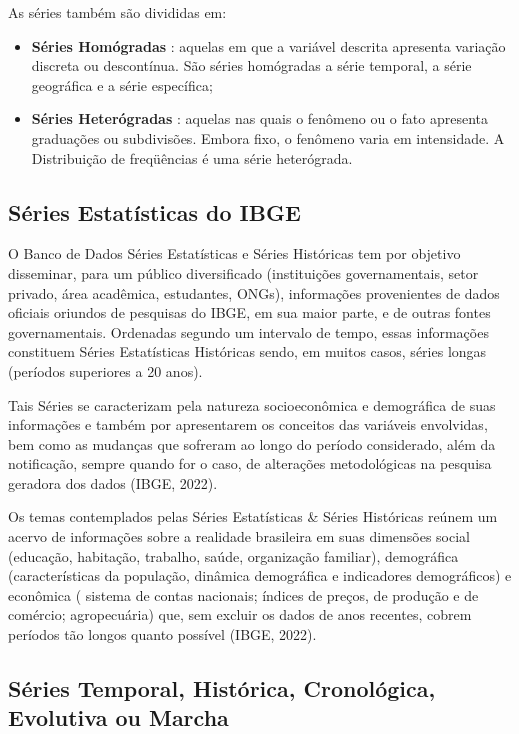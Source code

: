 As séries também são divididas em:


\begin{itemize}
  \item \textbf{Séries Homógradas} : aquelas em que a variável descrita apresenta variação discreta ou descontínua. São séries homógradas a série temporal, a série geográfica e a série específica;
 \item \textbf{Séries Heterógradas} : aquelas nas quais o fenômeno ou o fato apresenta graduações ou subdivisões. Embora fixo, o fenômeno varia em intensidade. A Distribuição de freqüências é uma série heterógrada.
\end{itemize}

\newpage
\subsection{Séries Estatísticas do IBGE}

O Banco de Dados Séries Estatísticas e Séries Históricas tem por objetivo disseminar, para um público diversificado (instituições governamentais, setor privado, área acadêmica, estudantes, ONGs), informações provenientes de dados oficiais oriundos de pesquisas do IBGE, em sua maior parte, e de outras fontes governamentais. Ordenadas segundo um intervalo de tempo, essas informações constituem Séries Estatísticas Históricas sendo, em muitos casos, séries longas (períodos superiores a 20 anos). \vskip0.3cm

Tais Séries se caracterizam pela natureza socioeconômica e demográfica de suas informações e também por apresentarem os conceitos das variáveis envolvidas, bem como as mudanças que sofreram ao longo do período considerado, além da notificação, sempre quando for o caso, de alterações metodológicas na pesquisa geradora dos dados (IBGE, 2022).\vskip0.3cm

Os temas contemplados pelas Séries Estatísticas \& Séries Históricas reúnem um acervo de informações sobre a realidade brasileira em suas dimensões social (educação, habitação, trabalho, saúde, organização familiar), demográfica (características da população, dinâmica demográfica e indicadores demográficos) e econômica ( sistema de contas nacionais; índices de preços, de produção e de comércio; agropecuária) que, sem excluir os dados de anos recentes, cobrem períodos tão longos quanto possível (IBGE, 2022).





\newpage 
\subsection{Séries Temporal, Histórica, Cronológica, Evolutiva ou Marcha}

